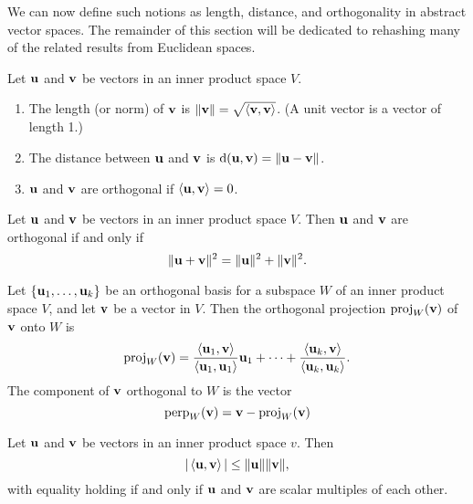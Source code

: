 \documentclass[../m73main.tex]{subfiles}
\begin{document}
We can now define such notions as length, distance, and orthogonality in abstract vector spaces.
The remainder of this section will be dedicated to rehashing many of the related results from Euclidean spaces.

\begin{definition}
	Let $\mathbf{u}$ and $\mathbf{v}$ be vectors in an inner product space $V$.
	\begin{enumerate}
		\item The length (or norm) of $\mathbf{v}$ is $\|\mathbf{v}\| = \sqrt{\left< \mathbf{v}, \mathbf{v} \right>}$.
		(A unit vector is a vector of length 1.)
		\item The distance between $\mathbf{u}$ and $\mathbf{v}$ is $\textrm{d}(\mathbf{u}, \mathbf{v}) = \|\mathbf{u} - \mathbf{v}\|$.
		\item $\mathbf{u}$ and $\mathbf{v}$ are orthogonal if $\left< \mathbf{u}, \mathbf{v} \right> = 0$.
	\end{enumerate}
\end{definition}

\begin{theorem}
	Let $\mathbf{u}$ and $\mathbf{v}$ be vectors in an inner product space $V$.
	Then $\mathbf{u}$ and $\mathbf{v}$ are orthogonal if and only if
	\[ \|\mathbf{u} + \mathbf{v}\|^2 = \|\mathbf{u}\|^2 + \|\mathbf{v}\|^2. \]
\end{theorem}

\begin{definition}
	Let $\{\mathbf{u}_1, \ldots, \mathbf{u}_k\}$ be an orthogonal basis for a subspace $W$ of an inner product space $V$, and let $\mathbf{v}$ be a vector in $V$.
	Then the orthogonal projection $\textrm{proj}_W(\mathbf{v})$ of $\mathbf{v}$ onto $W$ is
	\[ \textrm{proj}_W(\mathbf{v}) = \frac{\left< \mathbf{u}_1, \mathbf{v} \right>}{\left< \mathbf{u}_1, \mathbf{u}_1 \right>} \mathbf{u}_1 + \cdots + \frac{\left< \mathbf{u}_k, \mathbf{v} \right>}{\left< \mathbf{u}_k, \mathbf{u}_k \right>}. \]
	The component of $\mathbf{v}$ orthogonal to $W$ is the vector
	\[ \textrm{perp}_W(\mathbf{v}) = \mathbf{v} - \textrm{proj}_W(\mathbf{v}) \]
\end{definition}

\begin{theorem}
	Let $\mathbf{u}$ and $\mathbf{v}$ be vectors in an inner product space $v$.
	Then
	\[ |\left< \mathbf{u}, \mathbf{v} \right>| \leq \|\mathbf{u}\| \|\mathbf{v}\|, \]
	with equality holding if and only if $\mathbf{u}$ and $\mathbf{v}$ are scalar multiples of each other.
\end{theorem}
\end{document}
